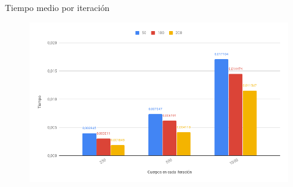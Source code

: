\documentclass[12pt]{article}
\begin{document}
\begin{enumerate}[label=(\Alph*)]
                \newpage
                \begin{center}
                    Tiempo medio por iteración
                \end{center}
                \begin{figure}[hbt!]
                    \centering
                    \includegraphics[width=\linewidth]{images/chart4.png}
                \end{figure}
                

\end{enumerate}
\end{document}
